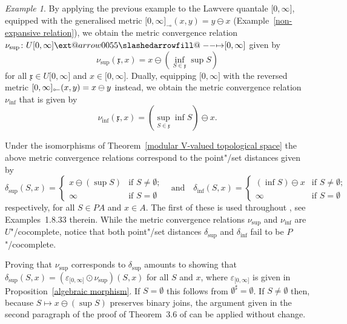 \documentclass[preprint, a4paper]{elsarticle}
\makeatletter
\def\slashedarrowfill@#1#2#3#4#5{%
  $\m@th\thickmuskip0mu\medmuskip\thickmuskip\thinmuskip\thickmuskip
   \relax#5#1\mkern-7mu%
   \cleaders\hbox{$#5\mkern-2mu#2\mkern-2mu$}\hfill
   \mathclap{#3}\mathclap{#2}%
   \cleaders\hbox{$#5\mkern-2mu#2\mkern-2mu$}\hfill
   \mkern-7mu#4$%
}
\def\rightslashedarrowfill@{%
  \slashedarrowfill@\relbar\relbar\mapstochar\rightarrow}
\newcommand\xslashedrightarrow[2][]{%
  \ext@arrow 0055{\rightslashedarrowfill@}{#1}{#2}}
\def\slashedrightarrow{\xslashedrightarrow{}}
\newcommand{\dashcirc}{\multimap}
\newcommand{\circdash}{\mathbin{\text{\reflectbox{$\multimap$}}}}
\theoremstyle{definition}
\theoremstyle{remark}
\newtheorem{example}[theorem]{Example}
\providecommand{\exref}[1]{Example~\ref{#1}}
\providecommand{\propref}[1]{Proposition~\ref{#1}}
\providecommand{\thmref}[1]{Theorem~\ref{#1}}
\providecommand{\eps}{\varepsilon}
\providecommand{\mf}[1]{\mathfrak{#1}}
\providecommand{\brks}[1]{\lbrack #1 \rbrack}
\providecommand{\hmap}[3]{#1\colon#2\slashedrightarrow#3}
\providecommand{\2}{\mathsf 2}
\providecommand{\hc}{\odot}
\makeatother
\begin{document}
	\begin{example} \label{Lawvere quantale as a modular approach space}
		By applying the previous example to the Lawvere quantale $\brks{0, \infty}$, equipped with the generalised metric $\brks{0, \infty}_{\dashcirc}(x, y) = y \ominus x$ (\exref{non-expansive relation}), we obtain the metric convergence relation $\hmap{\nu_{\sup}}{U\brks{0, \infty}}{\brks{0, \infty}}$ given by 
		\begin{displaymath}
			\nu_{\sup}(\mf x, x) = x \ominus (\inf_{S \in \mf x}\sup S)
		\end{displaymath}
		for all $\mf x \in U\brks{0, \infty}$ and $x \in \brks{0, \infty}$. Dually, equipping $\brks{0, \infty}$ with the reversed metric $\brks{0, \infty}_{\circdash}(x, y) = x \ominus y$ instead, we obtain the metric convergence relation $\nu_{\inf}$ that is given by
		\begin{displaymath}
			\nu_{\inf}(\mf x, x) = (\sup_{S \in \mf x}\inf S) \ominus x.
		\end{displaymath}
	
	Under the isomorphisms of \thmref{modular V-valued topological space} the above metric convergence relations correspond to the point"/set distances given by
		\begin{displaymath}
			\delta_{\sup}(S, x) = \begin{cases}
				x \ominus (\sup S) & \text{if $S \neq \emptyset$;} \\
				\infty & \text{if $S = \emptyset$}
			\end{cases} \quad \text{and} \quad \delta_{\inf}(S, x) = \begin{cases}
				(\inf S) \ominus x & \text{if $S \neq \emptyset$;} \\
				\infty & \text{if $S = \emptyset$}				
			\end{cases}
		\end{displaymath}
		respectively, for all $S \in PA$ and $x \in A$. The first of these is used throughout \cite{Lowen97}, see Examples~1.8.33 therein. While the metric convergence relations $\nu_{\sup}$ and $\nu_{\inf}$ are $U$"/cocomplete, notice that both point"/set distances $\delta_{\sup}$ and $\delta_{\inf}$ fail to be $P$"/cocomplete.
		
		Proving that $\nu_{\sup}$ corresponds to $\delta_{\sup}$ amounts to showing that $\delta_{\sup}(S, x) = (\eps_{\brks{0, \infty}} \hc \nu_{\sup})(S, x)$ for all $S$ and $x$, where $\eps_{\brks{0, \infty}}$ is given in \propref{algebraic morphism}. If $S = \emptyset$ this follows from $\emptyset^\sharp = \emptyset$. If $S \neq \emptyset$ then, because $S \mapsto x \ominus (\sup S)$ preserves binary joins, the argument given in the second paragraph of the proof of Theorem~3.6 of \cite{Lai-Tholen17a} can be applied without change.
	\end{example}
	
\end{document}

